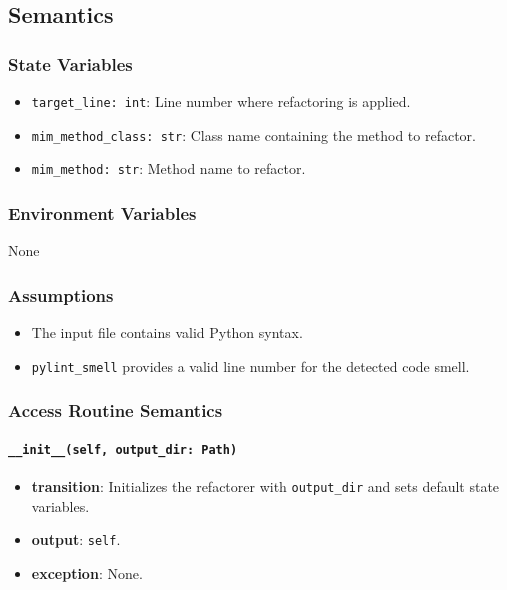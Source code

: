 \documentclass[12pt, titlepage]{article}
\begin{document}
\subsection{Semantics}
  
\subsubsection{State Variables}
\begin{itemize}
  \item \texttt{target\_line: int}: Line number where refactoring is applied.
  \item \texttt{mim\_method\_class: str}: Class name containing the method to refactor.
  \item \texttt{mim\_method: str}: Method name to refactor.
\end{itemize}
  
\subsubsection{Environment Variables}
None
  
\subsubsection{Assumptions}
\begin{itemize}
  \item The input file contains valid Python syntax.
  \item \texttt{pylint\_smell} provides a valid line number for the detected code smell.
\end{itemize}
  
\subsubsection{Access Routine Semantics}
  
\paragraph{\texttt{\_\_init\_\_(self, output\_dir: Path)}}
\begin{itemize}
  \item \textbf{transition}: Initializes the refactorer with \texttt{output\_dir} and sets default state variables.
  \item \textbf{output}: \texttt{self}.
  \item \textbf{exception}: None.
\end{itemize}
  
\end{document}
